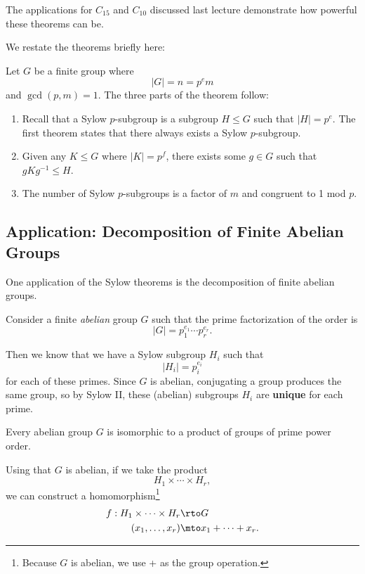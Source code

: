 The applications for $C_{15}$ and $C_{10}$ discussed last lecture demonstrate how powerful these theorems can be.

We restate the theorems briefly here:
\begin{theorem}
    Let $G$ be a finite group where \[|G| = n = p^em\] and $\gcd(p, m) =1$. The three parts of the theorem follow:
    \begin{enumerate}
        \item 
            Recall that a Sylow $p$-subgroup is a subgroup $H \leq G$ such that $|H| = p^e$. The first theorem states that there always exists a Sylow $p$-subgroup.
        \item 
            Given any $K \leq G$  where $|K| = p^f$, there exists some $g\in G$ such that $gKg^{-1} \leq H$.
        \item 
            The number of Sylow $p$-subgroups is a factor of $m$ and congruent to 1 mod $p$.
    \end{enumerate}
\end{theorem}

\subsection{Application: Decomposition of Finite Abelian Groups}
One application of the Sylow theorems is the decomposition of finite abelian groups. 

Consider a finite \emph{abelian} group $G$ such that the prime factorization of the order is \[|G| = p_1^{e_1} \cdots p_r ^{e_r}.\]

Then we know that we have a Sylow subgroup $H_i$ such that \[|H_i| = p_i^{e_i}\] for each of these primes. Since $G$ is abelian, conjugating a group produces the same group, so by Sylow II, these (abelian) subgroups $H_i$ are \textbf{unique} for each prime.

\begin{theorem}
Every abelian group $G$ is isomorphic to a product of groups of prime power order.
\end{theorem}

Using that $G$ is abelian, if we take the product \[H_1 \times \cdots \times H_r,\] we can construct a homomorphism\footnote{Because $G$ is abelian, we use + as the group operation.}
\begin{align*}
    f: H_1 \times \cdots \times H_r &\rto G \\
    (x_1, \ldots, x_r) &\mto x_1+ \cdots + x_r.
\end{align*}

